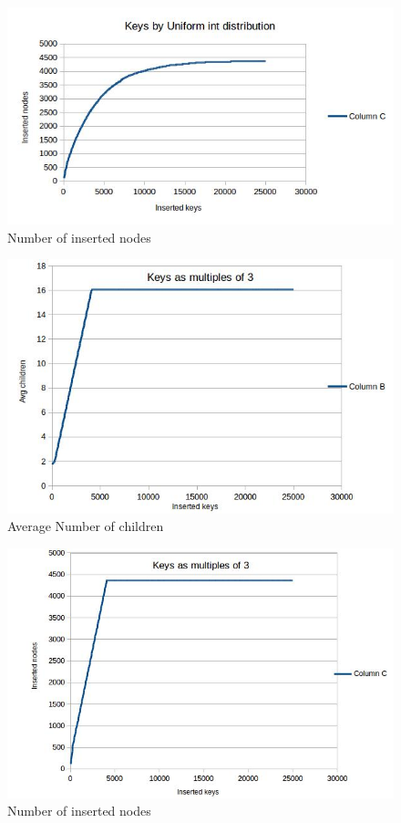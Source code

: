 \documentclass[12pt]{report}
\begin{document}
\begin{figure}
  \includegraphics[scale=0.4]{uniformnode}
  \caption{Number of inserted nodes}
\end{figure}

\begin{figure}
 \includegraphics[scale=0.4]{mul3child}
 \caption{Average Number of children}
\end{figure}

\begin{figure}
 \includegraphics[scale=0.4]{mul3node}
 \caption{Number of inserted nodes}
\end{figure}
\end{document}

